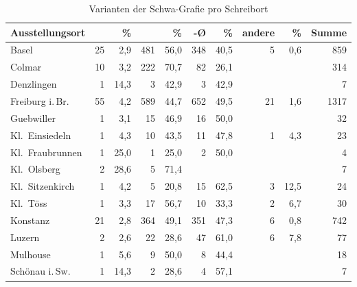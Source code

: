 \begin{table}
\caption{Varianten der Schwa-Grafie pro Schreibort}
\begin{tabular}{
	l @{\qquad}
	r r @{\qquad}
	r r @{\qquad}
	r r @{\qquad}
	r r @{\qquad}
	r}

\toprule

Ausstellungsort
	& \norm{-i} & \%
	& \norm{-e} & \%
	& -Ø & \%
	& andere & \%
	& Summe
	\\

\midrule

Basel
	& 25	& 2,9
	& 481	& 56,0
	& 348	& 40,5
	& 5		& 0,6
	& 859
	\\

Colmar
	& 10	& 3,2
	& 222	& 70,7
	& 82	& 26,1
	& 		&
	& 314
	\\

Denzlingen
	& 1 & 14,3
	& 3	& 42,9
	& 3	& 42,9
	& 	&
	& 7
	\\

Freiburg i.\,Br.
	& 55	& 4,2
	& 589	& 44,7
	& 652	& 49,5
	& 21	& 1,6
	& 1317
	\\

Guebwiller
	& 1		& 3,1
	& 15	& 46,9
	& 16	& 50,0
	& 		&
	& 32
	\\

Kl.~Einsiedeln
	& 1		& 4,3
	& 10	& 43,5
	& 11	& 47,8
	& 1		& 4,3
	& 23
	\\

Kl.~Fraubrunnen
	& 1	& 25,0
	& 1	& 25,0
	& 2	& 50,0
	&	&
	& 4
	\\

Kl.~Olsberg
	& 2	& 28,6
	& 5	& 71,4
	&	&
	&	&
	& 7
	\\

Kl.~Sitzenkirch
	& 1		& 4,2
	& 5		& 20,8
	& 15	& 62,5
	& 3		& 12,5
	& 24
	\\

Kl.~Töss
	& 1		& 3,3
	& 17	& 56,7
	& 10	& 33,3
	& 2		& 6,7
	& 30
	\\

Konstanz
	& 21 	& 2,8
	& 364	& 49,1
	& 351	& 47,3
	& 6		& 0,8
	& 742
	\\

Luzern
	& 2		& 2,6
	& 22	& 28,6
	& 47	& 61,0
	& 6		& 7,8
	& 77
	\\

Mulhouse
	& 1	& 5,6
	& 9	& 50,0
	& 8	& 44,4
	&	&
	& 18
	\\

Schönau i.\,Sw.
	& 1	& 14,3
	& 2	& 28,6
	& 4	& 57,1
	&	&
	& 7
	\\


\end{tabular}
\end{table}
